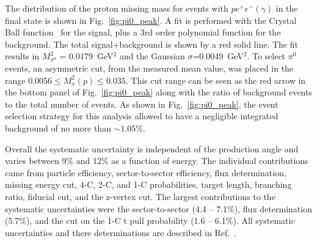 \documentclass[aps,prc,twocolumn,floatfix,showpacs,preprintnumbers,amsmath,amssymb,superscriptaddress,linenumbers]{revtex4-1}
\def\pizT{$\pi^{0} \ $}
\begin{document}
The distribution of the proton missing mass for events with 
$pe^+e^-(\gamma)$ in the final state is shown in Fig.~\ref{fig:pi0_peak}. 
A fit is performed with the Crystal Ball function~\cite{Oreglia:1980cs,
Skwarnicki:1986xj} for the signal, plus a 3rd order polynomial function 
for the background. The total signal+background is shown by a red solid 
line. The fit results in $M_{\pi^0}^2$ = 0.0179~GeV$^2$ and the Gaussian 
$\sigma$=0.0049~GeV$^2$. To select \pizT events, an asymmetric cut, from 
the measured mean value, was placed in the range $0.0056 \le  M_x^2(p) 
\le 0.035$. This cut range can be seen as the red arrow in the bottom 
panel of Fig.~\ref{fig:pi0_peak} along with the ratio of background 
events to the total number of events. As shown in Fig.~\ref{fig:pi0_peak}, 
the event selection strategy for this analysis allowed to have a 
negligible integrated background of no more than $\sim1.05\%$.

Overall the systematic uncertainty is independent of the production angle 
and varies between 9\% and 12\% as a function of energy. The individual 
contributions came from particle efficiency, sector-to-sector efficiency, 
flux determination, missing energy cut, 4-C, 2-C, and 1-C probabilities, 
target length, branching ratio, fiducial cut, and the z-vertex cut.
The largest contributions to the systematic uncertainties 
were the sector-to-sector (4.4 -- 7.1\%), flux determination (5.7\%),
and the cut on the 1-C t pull probability (1.6 -- 6.1\%). All systematic 
uncertainties and there determinations are described in Ref.~\cite{Kunkel}.

\end{document}
